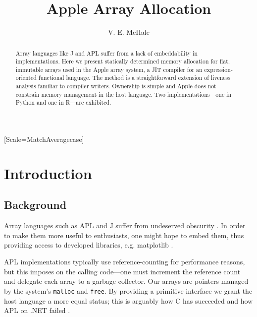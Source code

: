\documentclass[sigplan,screen,anonymous]{acmart}
\begin{document}
\setmonofont{Jet Brains Mono}[Scale=MatchAveragecase]

\begin{abstract}
    Array languages like J and APL suffer from a lack of embeddability in implementations.
    Here we present statically determined memory allocation for flat, immutable arrays used in the Apple array system, a JIT compiler for an expression-oriented functional language.
    The method is a straightforward extension of liveness analysis familiar to compiler writers.
    Ownership is simple and Apple does not constrain memory management in the host language.
    Two implementations---one in Python and one in R---are exhibited.
\end{abstract}

\title{Apple Array Allocation}
\author{V. E. McHale}
\maketitle

\section{Introduction}

\subsection{Background}

Array languages such as APL and J suffer from undeserved obscurity \cite{hsu2023}. In order to make them more useful to enthusiasts, one might hope to embed them, thus providing access to developed libraries, e.g. matplotlib \cite{hunter2007}.

APL implementations typically use reference-counting \cite[p.~47]{hui2020} for performance reasons, but this imposes on the calling code---one must increment the reference count and delegate each array to a garbage collector. Our arrays are pointers managed by the system's {\tt malloc} and {\tt free}. By providing a primitive interface we grant the host language a more equal status; this is arguably how C has succeeded \cite{kell2017} and how APL on .NET failed \cite[p.~12]{hui2020}.
\end{document}

